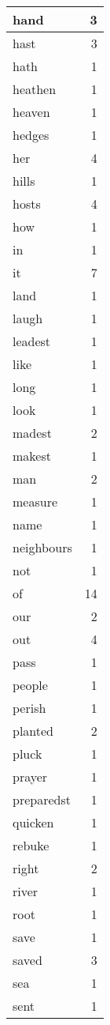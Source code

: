 \begin{center}
\begin{longtable}{l|r}
hand & 3 \\ \hline
hast & 3 \\ \hline
hath & 1 \\ \hline
heathen & 1 \\ \hline
heaven & 1 \\ \hline
hedges & 1 \\ \hline
her & 4 \\ \hline
hills & 1 \\ \hline
hosts & 4 \\ \hline
how & 1 \\ \hline
in & 1 \\ \hline
it & 7 \\ \hline
land & 1 \\ \hline
laugh & 1 \\ \hline
leadest & 1 \\ \hline
like & 1 \\ \hline
long & 1 \\ \hline
look & 1 \\ \hline
madest & 2 \\ \hline
makest & 1 \\ \hline
man & 2 \\ \hline
measure & 1 \\ \hline
name & 1 \\ \hline
neighbours & 1 \\ \hline
not & 1 \\ \hline
of & 14 \\ \hline
our & 2 \\ \hline
out & 4 \\ \hline
pass & 1 \\ \hline
people & 1 \\ \hline
perish & 1 \\ \hline
planted & 2 \\ \hline
pluck & 1 \\ \hline
prayer & 1 \\ \hline
preparedst & 1 \\ \hline
quicken & 1 \\ \hline
rebuke & 1 \\ \hline
right & 2 \\ \hline
river & 1 \\ \hline
root & 1 \\ \hline
save & 1 \\ \hline
saved & 3 \\ \hline
sea & 1 \\ \hline
sent & 1 \\ \hline

\end{longtable}
\end{center}
